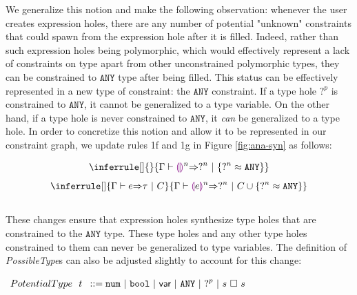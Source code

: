 We generalize this notion and make the following observation: whenever the user creates expression holes, there are any number of potential "unknown" constraints that could spawn from the expression hole after it is filled. Indeed, rather than such expression holes being polymorphic, which would effectively represent a lack of constraints on type apart from other unconstrained polymorphic types, they can be constrained to $\mathtt{ANY}$ type after being filled. This status can be effectively represented in a new type of constraint: the $\mathtt{ANY}$ constraint. If a type hole $?^p$ is constrained to $\mathtt{ANY}$, it cannot be generalized to a type variable. On the other hand, if a type hole is never constrained to $\mathtt{ANY}$, it \emph{can} be generalized to a type hole. In order to concretize this notion and allow it to be represented in our constraint graph, we update rules 1f and 1g in Figure \ref{fig:ana-syn} as follows:

\begin{equation}
    \inferrule[]{ }{
        \consexptyp{\Gamma}{\llparenthesiscolor \rrparenthesiscolor^n}{\tehole^n}{\{ \tehole^n \approx \mathtt{ANY} \}}
      }
\end{equation}
\vspace{-3px}
\begin{equation}
    \inferrule[]{
        \consexptyp{\Gamma}{e}{\tau}{C}
       }{
         \consexptyp{\Gamma}{\llparenthesiscolor e \rrparenthesiscolor^n}{\tehole^n}{C \cup \{ \tehole^n \approx \mathtt{ANY} \}}
       }
\end{equation}
\\
These changes ensure that expression holes synthesize type holes that are constrained to the $\mathtt{ANY}$ type. These type holes and any other type holes constrained to them can never be generalized to type variables. The definition of \emph{PossibleType}s can also be adjusted slightly to account for this change:
\begin{center}
$\arraycolsep=4pt\begin{array}{lll}
PotentialType~~ t & ::= 
  \tnum ~\vert~
  \tbool ~\vert~
  \TVar ~\vert~
  \mathtt{ANY} ~\vert~
  \tehole^p ~\vert~
  s ~\square~ s
  \\
\end{array}$
\end{center}


